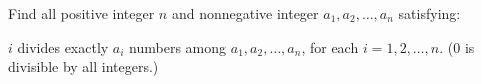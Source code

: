Find all positive integer $n$ and nonnegative integer $a_1,a_2,\dots,a_n$ satisfying:

$i$ divides exactly $a_i$ numbers among $a_1,a_2,\dots,a_n$, for each $i=1,2,\dots,n$.
($0$ is divisible by all integers.)